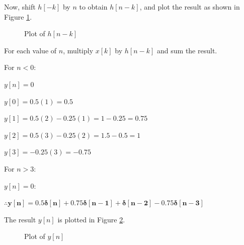 \documentclass[fleqn]{article}
\begin{document}
\begin{enumerate}[nolistsep]
		Now, shift $h[-k]$ by $n$ to obtain $h[n-k]$, and plot the result as shown in Figure \ref{prob1_hn-k_plot}.
		
		\begin{figure}[H]				
			\centerline{}
			\caption{Plot of $h[n-k]$}
			\label{prob1_hn-k_plot}
		\end{figure}
		
		For each value of $n$, multiply $x[k]$ by $h[n-k]$ and sum the result.
		
		For $n < 0$:
		
		$y[n] = 0$
		
		$y[0] = 0.5(1) = 0.5$
		
		$y[1] = 0.5(2) - 0.25(1) = 1 - 0.25 = 0.75$
		
		$y[2] = 0.5(3) - 0.25(2) = 1.5 - 0.5 = 1$
		
		$y[3] = -0.25(3) = -0.75$
		
		For $n > 3$:
		
		$y[n] = 0$:
		
		$\mathbf{\therefore y[n] = 0.5\delta[n] + 0.75\delta[n-1] + \delta[n-2] - 0.75\delta[n-3]}$
		
		The result $y[n]$ is plotted in Figure \ref{prob1_yn_plot}.
		
		\begin{figure}[H]				
			\centerline{}
			\caption{Plot of $y[n]$}
			\label{prob1_yn_plot}
		\end{figure}
		

\end{enumerate}
\end{document}
